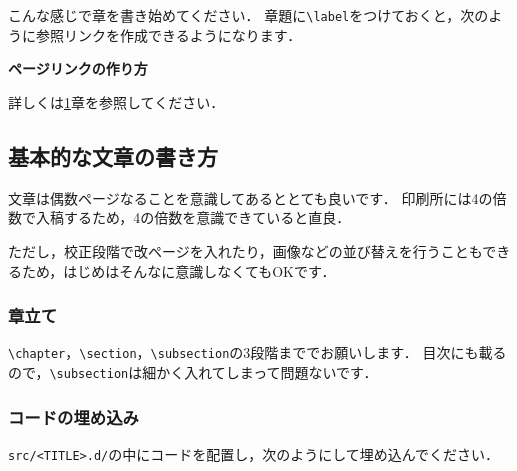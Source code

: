 \chapter{\chTitleExample}\label{ch:example}

こんな感じで章を書き始めてください．
章題に\lstinline{\label}をつけておくと，次のように参照リンクを作成できるようになります．

\begin{columnbox}
  \textbf{ページリンクの作り方}

  詳しくは\ref{ch:example}章を参照してください．
\end{columnbox}

\section{基本的な文章の書き方}

文章は偶数ページなることを意識してあるととても良いです．
印刷所には4の倍数で入稿するため，4の倍数を意識できていると直良．

ただし，校正段階で改ページを入れたり，画像などの並び替えを行うこともできるため，はじめはそんなに意識しなくてもOKです．


\subsection{章立て}

\lstinline{\chapter}，\lstinline{\section}，\lstinline{\subsection}の3段階まででお願いします．
目次にも載るので，\lstinline{\subsection}は細かく入れてしまって問題ないです．

\subsection{コードの埋め込み}

\lstinline{src/<TITLE>.d/}の中にコードを配置し，次のようにして埋め込んでください．


